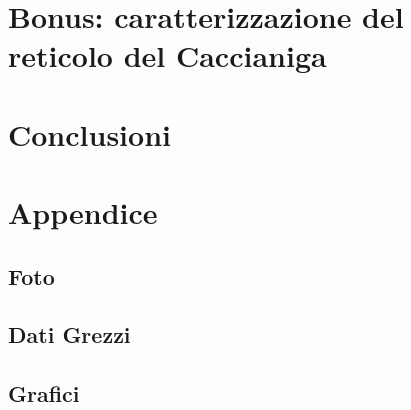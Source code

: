 \documentclass{article}
\begin{document}
\section{Bonus: caratterizzazione del reticolo del Caccianiga}

\section{Conclusioni}

\newpage
\section{Appendice}
\subsection{Foto}
\subsection{Dati Grezzi}
\subsection{Grafici}
\end{document}
